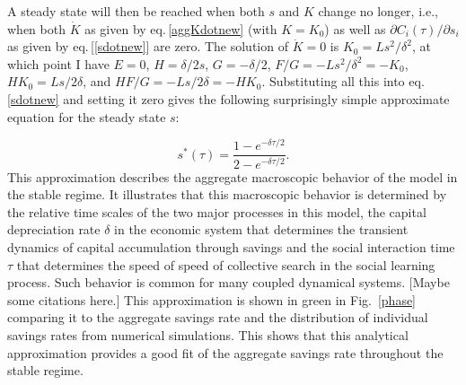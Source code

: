 A steady state will then be reached when both $s$ and $K$ change no longer, i.e., when both $\dot K$ as given by eq.\,\eqref{aggKdotnew} (with $K=K_0$) as well as $\partial C_i(\tau)/\partial s_i$ as given by eq.\,[\ref{sdotnew}]
are zero.
The solution of $\dot K = 0$ is 
$K_0 = L s^2 / \delta^2$, 
at which point I have
$E = 0$,
$H = \delta / 2 s$, 
$G = - \delta / 2$, 
$F/G = - L s^2 / \delta^2 = - K_0$, 
$H K_0 = L s / 2 \delta$, and
$H F / G = - L s / 2 \delta = - H K_0$.
Substituting all this into eq.\,\eqref{sdotnew} and setting it zero gives the following surprisingly simple approximate equation for the steady state $s$:

\begin{equation}
\label{eq:s_optimal}
s^\ast(\tau) = \frac{1 - e^{-\delta \tau/2}}{2 - e^{-\delta \tau/2}}.
\end{equation}
This approximation describes the aggregate macroscopic behavior of the model in the stable regime. It illustrates that this macroscopic behavior is determined by the relative time scales of the two major processes in this model, the capital depreciation rate $\delta$ in the economic system that determines the transient dynamics of capital accumulation through savings and the social interaction time $\tau$ that determines the speed of speed of collective search in the social learning process. Such behavior is common for many coupled dynamical systems. [Maybe some citations here.] This approximation is shown in green in Fig.~\ref{phase} comparing it to the aggregate savings rate and the distribution of individual savings rates from numerical simulations. This shows that this analytical approximation provides a good fit of the aggregate savings rate throughout the stable regime.

